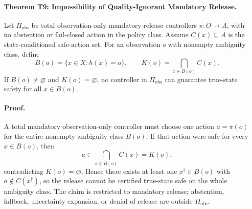 \paragraph{Theorem T9: Impossibility of Quality-Ignorant Mandatory Release.}
Let \(\Pi_{\mathrm{obs}}\) be total observation-only mandatory-release
controllers \(\pi:O\to A\), with no abstention or fail-closed action in the
policy class. Assume \(C(x)\subseteq A\) is the state-conditioned safe-action
set. For an observation \(o\) with nonempty ambiguity class, define
\[
  B(o)=\{x\in X:h(x)=o\},\qquad
  K(o)=\bigcap_{x\in B(o)} C(x).
\]
If \(B(o)\ne\varnothing\) and \(K(o)=\varnothing\), no controller in
\(\Pi_{\mathrm{obs}}\) can guarantee true-state safety for all \(x\in B(o)\).

\paragraph{Proof.}
A total mandatory observation-only controller must choose one action
\(a=\pi(o)\) for the entire nonempty ambiguity class \(B(o)\). If that action
were safe for every \(x\in B(o)\), then
\[
  a\in\bigcap_{x\in B(o)}C(x)=K(o),
\]
contradicting \(K(o)=\varnothing\). Hence there exists at least one
\(x^\dagger\in B(o)\) with \(a\notin C(x^\dagger)\), so the release cannot be
certified true-state safe on the whole ambiguity class. The claim is restricted
to mandatory release; abstention, fallback, uncertainty expansion, or denial of
release are outside \(\Pi_{\mathrm{obs}}\).
